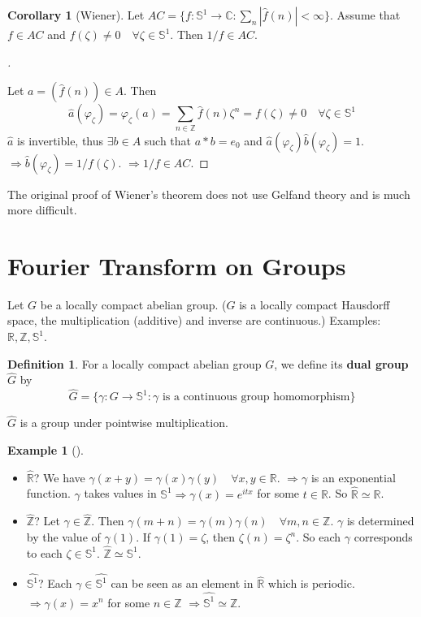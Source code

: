 \documentclass{article}
\theoremstyle{definition}
\newtheorem{ex}{Example}
\newtheorem{dfn}{Definition}
\newtheorem{cor}{Corollary}
\newenvironment{proofs}[1][\proofname]{%
  \begin{proof}[#1]$ $\par\nobreak\ignorespaces
}{%
  \end{proof}
}
\newenvironment{exs}[1][]{%
  \begin{ex}[#1]$ $\par\nobreak\ignorespaces
}{%
  \end{ex}
}
\newcommand{\CC}{\mathbb C}
\newcommand{\RR}{\mathbb R}
\renewcommand{\SS}{\mathbb S}
\newcommand{\ZZ}{\mathbb Z}
\newcommand{\Ra}{\Rightarrow}
\begin{document}
\begin{cor}[Wiener]
	Let $AC = \{f: \SS^1 \to \CC: \sum_n |\widehat{f}(n)| < \infty\}$.
	Assume that $f \in AC$ and $f(\zeta) \neq 0 \quad \forall \zeta \in \SS^1$.
	Then $1/f \in AC$.
\end{cor}

\begin{proofs}
	Let $a = (\widehat{f}(n)) \in A$.
	Then
	\[
		\widehat{a}(\varphi_\zeta) = \varphi_\zeta(a) = \sum_{n \in \ZZ} \widehat{f}(n) \zeta^n = f(\zeta) \neq 0 \quad \forall \zeta \in \SS^1
	\]
	$\widehat{a}$ is invertible, thus $\exists b \in A$ such that $a * b = e_0$ and $\widehat{a} (\varphi_\zeta) \widehat{b}(\varphi_\zeta) = 1$.
	$\Ra \widehat{b}(\varphi_\zeta) = 1/f(\zeta)$.
	$\Ra 1/f \in AC$.
\end{proofs}

The original proof of Wiener's theorem does not use Gelfand theory and is much more difficult.

\section{Fourier Transform on Groups}

Let $G$ be a locally compact abelian group.
($G$ is a locally compact Hausdorff space, the multiplication (additive) and inverse are continuous.)
Examples: $\RR, \ZZ, \SS^1$.

\begin{dfn}
	For a locally compact abelian group $G$, we define its \textbf{dual group} $\widehat{G}$ by 
	\[
		\widehat{G} = \{\gamma: G \to \SS^1: \gamma \text{ is a continuous group homomorphism}\}
	\]
\end{dfn}
$\widehat{G}$ is a group under pointwise multiplication.

\begin{exs}
	\begin{itemize}
		\item $\widehat{\RR}$?
			We have $\gamma(x + y) = \gamma(x) \gamma(y) \quad \forall x, y \in \RR$.
			$\Ra \gamma$ is an exponential function.
			$\gamma$ takes values in $\SS^1 \Ra \gamma(x) = e^{itx}$ for some $t \in \RR$.
			So $\widehat{\RR} \simeq \RR$.

		\item $\widehat{\ZZ}$?
			Let $\gamma \in \widehat{\ZZ}$.
			Then $\gamma(m + n) = \gamma(m) \gamma(n) \quad \forall m, n \in \ZZ$.
			$\gamma$ is determined by the value of $\gamma(1)$.
			If $\gamma(1) = \zeta$, then $\zeta(n) = \zeta^n$.
			So each $\gamma$ corresponds to each $\zeta \in \SS^1$.
			$\widehat{\ZZ} \simeq \SS^1$.

		\item $\widehat{\SS^1}$?
			Each $\gamma \in \widehat{\SS^1}$ can be seen as an element in $\widehat{\RR}$ which is periodic.
			$\Ra \gamma(x) = x^n$ for some $n \in \ZZ$
			$\Ra \widehat{\SS^1} \simeq \ZZ$.
	\end{itemize}
\end{exs}
\end{document}
